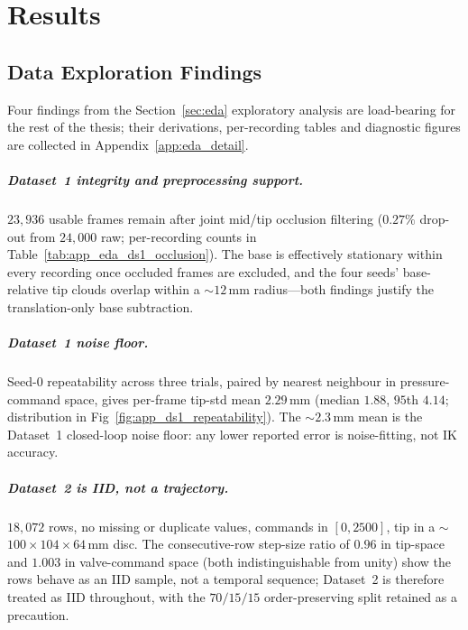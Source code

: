 \chapter{Results}
\label{chap:results}


\section{Data Exploration Findings}
\label{sec:eda_findings}

Four findings from the Section~\ref{sec:eda} exploratory analysis are load-bearing for the rest of the thesis; their derivations, per-recording tables and diagnostic figures are collected in Appendix~\ref{app:eda_detail}.

\paragraph{Dataset~1 integrity and preprocessing support.}
$23{,}936$ usable frames remain after joint mid/tip occlusion filtering ($0.27\%$ drop-out from $24{,}000$ raw; per-recording counts in Table~\ref{tab:app_eda_ds1_occlusion}). The base is effectively stationary within every recording once occluded frames are excluded, and the four seeds' base-relative tip clouds overlap within a $\sim$$12$\,mm radius---both findings justify the translation-only base subtraction.

\paragraph{Dataset~1 noise floor.}
Seed-0 repeatability across three trials, paired by nearest neighbour in pressure-command space, gives per-frame tip-std mean $2.29$\,mm (median $1.88$, $95$th $4.14$; distribution in Fig~\ref{fig:app_ds1_repeatability}). The $\sim$$2.3$\,mm mean is the Dataset~1 closed-loop noise floor: any lower reported error is noise-fitting, not IK accuracy.

\paragraph{Dataset~2 is IID, not a trajectory.}
$18{,}072$ rows, no missing or duplicate values, commands in $[0, 2500]$, tip in a $\sim$$100 \times 104 \times 64$\,mm disc. The consecutive-row step-size ratio of $0.96$ in tip-space and $1.003$ in valve-command space (both indistinguishable from unity) show the rows behave as an IID sample, not a temporal sequence; Dataset~2 is therefore treated as IID throughout, with the $70/15/15$ order-preserving split retained as a precaution.

